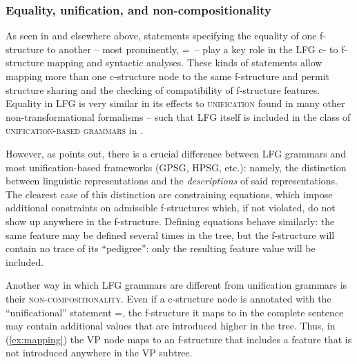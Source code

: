 \documentclass[output=paper,hidelinks]{langscibook}
\begin{document}
 \subsubsection{Equality, unification, and non-compositionality}
 
 As seen in  and elsewhere above, statements specifying the equality of one f-structure to another -- most prominently, \UP=\DOWN\ -- play a key role in the LFG c- to f-structure mapping and syntactic analyses. These kinds of statements allow mapping more than one c-structure node to the same f-structure and permit structure sharing and the checking of compatibility of f-structure features. Equality in LFG is very similar in its effects to \textsc{unification} found in many other non-transformational formalisms -- such that LFG itself is included in the class of \textsc{unification-based grammars} in \textcite{shieber1986}.

 However, as \textcite[8ff.]{kapl:89} points out, there is a crucial difference between LFG grammars and most unification-based frameworks (GPSG, HPSG, etc.): namely, the distinction between linguistic representations and the \textit{descriptions} of said representations. The clearest case of this distinction are constraining equations, which impose additional constraints on admissible f-structures which, if not violated, do not show up anywhere in the f-structure. Defining equations behave similarly: the same feature may be defined several times in the tree, but the f-structure will contain no trace of its ``pedigree'': only the resulting feature value will be included.
 
 Another way in which LFG grammars are different from unification grammars is their \textsc{non-compositionality}. Even if a c-structure node is annotated with the ``unificational'' statement \UP=\DOWN, the f-structure it maps to in the complete sentence may contain additional values that are introduced higher in the tree. Thus, in (\ref{ex:mapping}) the VP node maps to an f-structure that includes a \SUBJ feature that is not introduced anywhere in the VP subtree.
 
\end{document}
